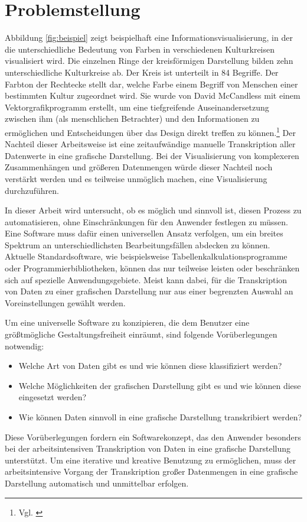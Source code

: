 \documentclass[a4paper, 
               12pt,
               DIV=calc,
               version=first,
               pdftex,
               headsepline,
               footsepline,
               bibtotocnumbered,
               liststotocnumbered]{scrreprt}
\begin{document}
\section{Problemstellung}
Abbildung \ref{fig:beispiel} zeigt beispielhaft eine Informationsvisualisierung, in der die
unterschiedliche Bedeutung von Farben in verschiedenen
Kulturkreisen visualisiert wird. Die einzelnen Ringe der kreisförmigen Darstellung bilden zehn
unterschiedliche Kulturkreise ab. Der Kreis ist unterteilt in 84 Begriffe.
Der Farbton der Rechtecke stellt dar, welche Farbe einem Begriff von Menschen einer bestimmten Kultur zugeordnet wird.
Sie wurde von David McCandless mit einem Vektorgrafikprogramm erstellt, um
eine tiefgreifende Auseinandersetzung zwischen ihm (als menschlichen Betrachter) und den Informationen
zu ermöglichen und Entscheidungen über das Design direkt treffen zu können.\footnote{Vgl. \citep{infoblog}} Der Nachteil dieser
Arbeitsweise ist eine zeitaufwändige manuelle Transkription aller Datenwerte in eine grafische
Darstellung. Bei der Visualisierung von komplexeren Zusammenhängen und größeren Datenmengen würde dieser 
Nachteil noch verstärkt werden und es teilweise unmöglich machen, eine Visualisierung durchzuführen.

In dieser Arbeit wird untersucht, ob es möglich und sinnvoll ist, diesen Prozess  zu automatisieren,
ohne Einschränkungen für den Anwender festlegen zu müssen.
Eine Software muss dafür einen universellen Ansatz verfolgen, um ein breites Spektrum an
unterschiedlichsten Bearbeitungsfällen abdecken zu können. 
Aktuelle Standardsoftware, wie beispielsweise Tabellenkalkulationsprogramme oder Programmierbibliotheken,
können das nur teilweise leisten oder beschränken sich auf spezielle Anwendungsgebiete.
Meist kann dabei, für die Transkription von Daten zu einer grafischen Darstellung nur
aus einer begrenzten Auswahl an Voreinstellungen gewählt werden.

Um eine universelle Software zu konzipieren, die dem Benutzer eine größtmögliche
Gestaltungsfreiheit einräumt, sind folgende Vorüberlegungen notwendig:
\begin{itemize}
\item{Welche Art von Daten gibt es und wie können diese klassifiziert werden?}
\item{Welche Möglichkeiten der grafischen Darstellung gibt es und wie können diese eingesetzt werden?}
\item{Wie können Daten sinnvoll in eine grafische Darstellung transkribiert werden?}
\end{itemize}
Diese Vorüberlegungen fordern ein Softwarekonzept, das den Anwender besonders bei der 
arbeitsintensiven Transkription
von Daten in eine grafische Darstellung unterstützt.
Um eine iterative und kreative Benutzung zu ermöglichen, muss der arbeitsintensive Vorgang
der Transkription großer Datenmengen in eine grafische Darstellung
automatisch und unmittelbar erfolgen.
\end{document}

